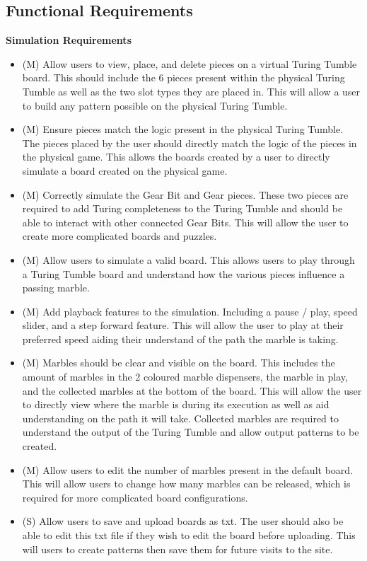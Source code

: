 \documentclass{l4proj}
\begin{document}
\subsection{Functional Requirements}
\textbf{Simulation Requirements}
\begin{itemize}
    \item (M) Allow users to view, place, and delete pieces on a virtual Turing Tumble board. This should include the 6 pieces present within the physical Turing Tumble as well as the two slot types they are placed in. This will allow a user to build any pattern possible on the physical Turing Tumble.
    \item (M) Ensure pieces match the logic present in the physical Turing Tumble. The pieces placed by the user should directly match the logic of the pieces in the physical game. This allows the boards created by a user to directly simulate a board created on the physical game.
    \item (M) Correctly simulate the Gear Bit and Gear pieces. These two pieces are required to add Turing completeness to the Turing Tumble and should be able to interact with other connected Gear Bits. This will allow the user to create more complicated boards and puzzles.
    \item (M) Allow users to simulate a valid board. This allows users to play through a Turing Tumble board and understand how the various pieces influence a passing marble.
    \item (M) Add playback features to the simulation. Including a pause / play, speed slider, and a step forward feature. This will allow the user to play at their preferred speed aiding their understand of the path the marble is taking.
    \item (M) Marbles should be clear and visible on the board. This includes the amount of marbles in the 2 coloured marble dispensers, the marble in play, and the collected marbles at the bottom of the board. This will allow the user to directly view where the marble is during its execution as well as aid understanding on the path it will take. Collected marbles are required to understand the output of the Turing Tumble and allow output patterns to be created.
    \item (M) Allow users to edit the number of marbles present in the default board. This will allow users to change how many marbles can be released, which is required for more complicated board configurations.
    \item (S) Allow users to save and upload boards as txt. The user should also be able to edit this txt file if they wish to edit the board before uploading. This will users to create patterns then save them for future visits to the site.

\end{itemize}
\end{document}
